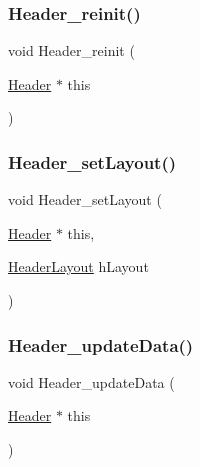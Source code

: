 \subsubsection{\texorpdfstring{Header\+\_\+reinit()}{Header\_reinit()}}
{\footnotesize\ttfamily void Header\+\_\+reinit (\begin{DoxyParamCaption}\item[{\hyperlink{linux_2download_2htop-3_83_80_2Header_8h_a7f4dfcf80c34406946a7bda3d88d5e36}{Header} $\ast$}]{this }\end{DoxyParamCaption})}

\mbox{\label{linux_2download_2htop-3_83_80_2Header_8h_a9918e7a64f023cbafbe9e52e7073c4f7}} 
\subsubsection{\texorpdfstring{Header\+\_\+set\+Layout()}{Header\_setLayout()}}
{\footnotesize\ttfamily void Header\+\_\+set\+Layout (\begin{DoxyParamCaption}\item[{\hyperlink{linux_2download_2htop-3_83_80_2Header_8h_a7f4dfcf80c34406946a7bda3d88d5e36}{Header} $\ast$}]{this,  }\item[{\hyperlink{HeaderLayout_8h_afc9cb7b84041249bac419260f679b6a9}{Header\+Layout}}]{h\+Layout }\end{DoxyParamCaption})}

\mbox{\label{linux_2download_2htop-3_83_80_2Header_8h_a920f6f5b28ea524edde6e59c51ef5632}} 
\subsubsection{\texorpdfstring{Header\+\_\+update\+Data()}{Header\_updateData()}}
{\footnotesize\ttfamily void Header\+\_\+update\+Data (\begin{DoxyParamCaption}\item[{\hyperlink{linux_2download_2htop-3_83_80_2Header_8h_a7f4dfcf80c34406946a7bda3d88d5e36}{Header} $\ast$}]{this }\end{DoxyParamCaption})}


